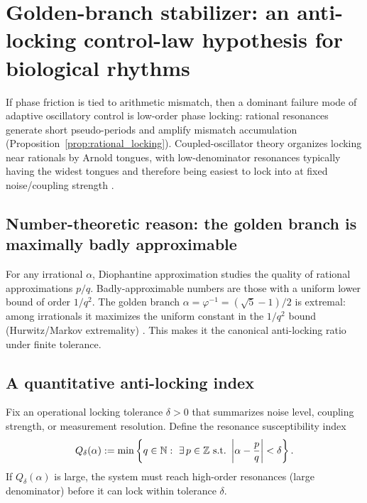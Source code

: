 \section{Golden-branch stabilizer: an anti-locking control-law hypothesis for biological rhythms}
\label{sec:golden_control}

If phase friction is tied to arithmetic mismatch, then a dominant failure mode of adaptive oscillatory control is low-order phase locking: rational resonances generate short pseudo-periods and amplify mismatch accumulation (Proposition~\ref{prop:rational_locking}).
Coupled-oscillator theory organizes locking near rationals by Arnold tongues, with low-denominator resonances typically having the widest tongues and therefore being easiest to lock into at fixed noise/coupling strength \cite{Strogatz1994,PikovskyRosenblumKurths2001}.

\subsection{Number-theoretic reason: the golden branch is maximally badly approximable}
\label{sec:golden_number_theory}

For any irrational $\alpha$, Diophantine approximation studies the quality of rational approximations $p/q$.
Badly-approximable numbers are those with a uniform lower bound of order $1/q^2$.
The golden branch $\alpha=\varphi^{-1}=(\sqrt{5}-1)/2$ is extremal: among irrationals it maximizes the uniform constant in the $1/q^2$ bound (Hurwitz/Markov extremality) \cite{Cassels1957}.
This makes it the canonical anti-locking ratio under finite tolerance.

\subsection{A quantitative anti-locking index}
\label{sec:qdelta}

Fix an operational locking tolerance $\delta>0$ that summarizes noise level, coupling strength, or measurement resolution.
Define the resonance susceptibility index
\begin{equation}
  Q_\delta(\alpha)
  := \min\left\{q\in\NN:\ \exists\,p\in\ZZ\ \text{s.t.}\ \left|\alpha-\frac{p}{q}\right|<\delta\right\}.
  \label{eq:Qdelta_def}
\end{equation}
If $Q_\delta(\alpha)$ is large, the system must reach high-order resonances (large denominator) before it can lock within tolerance $\delta$.

